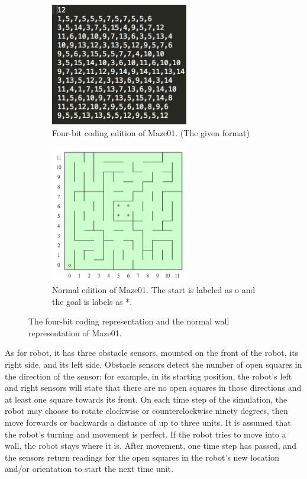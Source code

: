 \documentclass[11pt, oneside]{article}   	%
\begin{document}
\begin{figure}
\centering
\begin{subfigure}{7cm}
  \centering
  \includegraphics[width=6cm]{coded_maze01.png}
  \caption{Four-bit coding edition of Maze01. (The given format)}
  \label{fig:four-bit-Maze01}
\end{subfigure}%
\begin{subfigure}{7cm}
  \centering
  \includegraphics[width=6cm]{maze-01.png}
  \caption{Normal edition of Maze01. The start is labeled as o and the goal is labels as *.}
  \label{fig:Maze01}
\end{subfigure}
\caption{The four-bit coding representation and the normal wall representation of Maze01.}
\label{fig:test}
\end{figure}

As for robot, it has three obstacle sensors, mounted on the front of the robot, its right side, and its left side. Obstacle sensors detect the number of open squares in the direction of the sensor; for example, in its starting position, the robot’s left and right sensors will state that there are no open squares in those directions and at least one square towards its front. On each time step of the simulation, the robot may choose to rotate clockwise or counterclockwise ninety degrees, then move forwards or backwards a distance of up to three units. It is assumed that the robot’s turning and movement is perfect. If the robot tries to move into a wall, the robot stays where it is. After movement, one time step has passed, and the sensors return readings for the open squares in the robot’s new location and/or orientation to start the next time unit.
\end{document}
